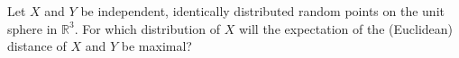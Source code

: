 Let $X$ and $Y$ be independent, identically distributed random points on the unit sphere in $\mathbb{R}^3$. For which distribution of $X$ will the expectation of the (Euclidean) distance of $X$ and $Y$ be maximal?